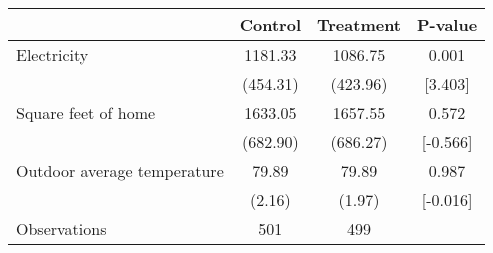 \begin{tabular}{lccc}
\toprule
{} &   Control & Treatment &   P-value \\
\midrule
Electricity                 &   1181.33 &   1086.75 &     0.001 \\
                            &  (454.31) &  (423.96) &   [3.403] \\
Square feet of home         &   1633.05 &   1657.55 &     0.572 \\
                            &  (682.90) &  (686.27) &  [-0.566] \\
Outdoor average temperature &     79.89 &     79.89 &     0.987 \\
                            &    (2.16) &    (1.97) &  [-0.016] \\
Observations                &       501 &       499 &           \\
\bottomrule
\end{tabular}
